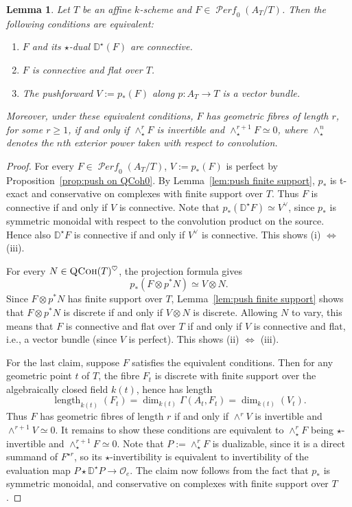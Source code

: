 \documentclass[12pt, oneside]{amsart}
\numberwithin{equation}{section}
\newtheorem{lemma}[subsubsection]{Lemma}
\theoremstyle{remark}
\theoremstyle{plain}
\renewcommand{\geq}{\geqslant}
\DeclareMathOperator{\QCoh}{\textsc{QCoh}}
\DeclareMathOperator{\PERF}{\mathcal{P}\textit{erf}}
\newcommand{\OO}{\mathcal{O}}
\begin{document}
\begin{lemma}\label{lem:Coh_0^r wedge finite}
Let $T$ be an affine $k$-scheme and $F \in \PERF_0(A_T/T)$.
Then the following conditions are equivalent:
\begin{enumerate}
	\item $F$ and its $\star$-dual $\mathbb{D}^\star(F)$ are connective.
	\item $F$ is connective and flat over $T$.
	\item The pushforward $V := p_*(F)$ along $p : A_T \to T$ is a vector bundle.
\end{enumerate}
Moreover, under these equivalent conditions, $F$ has geometric fibres of length $r$, for some $r \geq 1$, if and only if $\wedge_\star^r F$ is invertible and $\wedge_\star^{r+1}F\simeq 0$, where $\wedge_\star^n$ denotes the $n$th exterior power taken with respect to convolution.
\end{lemma}
\begin{proof}
For every $F \in \PERF_0(A_T/T)$, $V := p_*(F)$ is perfect by Proposition~\ref{prop:push on QCoh0}.
By Lemma~\ref{lem:push finite support}, $p_*$ is t-exact and conservative on complexes with finite support over $T$.
Thus $F$ is connective if and only if $V$ is connective.
Note that $p_*(\mathbb{D}^\star F)\simeq V^\vee$, since $p_*$ is symmetric monoidal with respect to the convolution product on the source.
Hence also $\mathbb{D}^\star F$ is connective if and only if $V^\vee$ is connective.
This shows (i) $\Leftrightarrow$ (iii).

For every $N\in\QCoh(T)^\heartsuit$, the projection formula gives
\[
  p_*(F\otimes p^*N)\simeq V\otimes N.
\]
Since $F\otimes p^*N$ has finite support over $T$, Lemma~\ref{lem:push finite support} shows that $F\otimes p^*N$ is discrete if and only if $V\otimes N$ is discrete.
Allowing $N$ to vary, this means that $F$ is connective and flat over $T$ if and only if $V$ is connective and flat, i.e., a vector bundle (since $V$ is perfect).
This shows (ii) $\Leftrightarrow$ (iii).

For the last claim, suppose $F$ satisfies the equivalent conditions.
Then for any geometric point $t$ of $T$, the fibre $F_t$ is discrete with finite support over the algebraically closed field $k(t)$, hence has length
\[
  \operatorname{length}_{k(t)}(F_t)
  = \dim_{k(t)}\Gamma(A_t, F_t)
  = \dim_{k(t)}(V_t).
\]
Thus $F$ has geometric fibres of length $r$ if and only
if $\wedge^r V$ is invertible and $\wedge^{r+1}V\simeq0$.
It remains to show these conditions are equivalent to $\wedge_\star^r F$ being $\star$-invertible and $\wedge^{r+1}_\star F\simeq 0$.
Note that $P := \wedge_\star^r F$ is dualizable, since it is a direct summand of $F^{\star r}$, so its $\star$-invertibility is equivalent to invertibility of the evaluation map $P\star\mathbb{D}^\star P \to \OO_e$.
The claim now follows from the fact that $p_*$ is symmetric monoidal, and conservative on complexes with finite support over $T$.
\end{proof}
\end{document}
